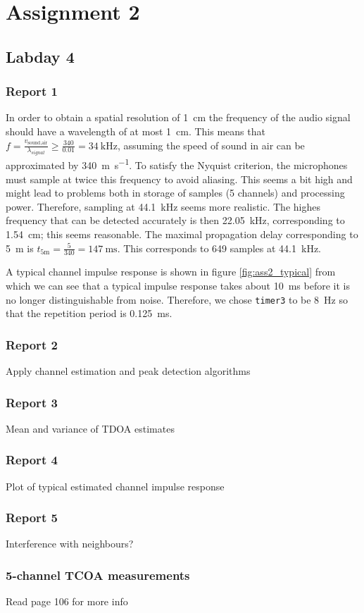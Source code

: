 \documentclass[11pt,titlepage]{report}
\begin{document}
\chapter{Assignment 2}
\section{Labday 4}

\subsection{Report 1}
In order to obtain a spatial resolution of \SI{1}{\centi\meter} the frequency of the audio signal should have a wavelength of at most \SI{1}{\centi\meter}. This means that $f=\frac{v_\text{sound,air}}{\lambda_{signal}}\geq\frac{340}{0.01}=\SI{34}{\kilo\hertz}$, assuming the speed of sound in air can be approximated by \SI{340}{\meter\per\second}. To satisfy the Nyquist criterion, the microphones must sample at twice this frequency to avoid aliasing. This seems a bit high and might lead to problems both in storage of samples (5 channels) and processing power. Therefore, sampling at \SI{44.1}{\kilo\hertz} seems more realistic. The highes frequency that can be detected accurately is then \SI{22.05}{\kilo\hertz}, corresponding to \SI{1.54}{\centi\meter}; this seems reasonable. The maximal propagation delay corresponding to \SI{5}{\meter} is $t_{\text{5m}}=\frac{5}{340}=\SI{147}{\milli\second}$. This corresponds to \num{649} samples at \SI{44.1}{\kilo\hertz}.


A typical channel impulse response is shown in figure \ref{fig:ass2_typical} from which we can see that a typical impulse response takes about \SI{10}{\milli\second} before it is no longer distinguishable from noise. Therefore, we chose \texttt{timer3} to be \SI{8}{\hertz} so that the repetition period is \SI{0.125}{\milli\second}.

\subsection{Report 2}
Apply channel estimation and peak detection algorithms

\subsection{Report 3}
Mean and variance of TDOA estimates

\subsection{Report 4}
Plot of typical estimated channel impulse response

\subsection{Report 5}
Interference with neighbours?

\subsection{5-channel TCOA measurements}
Read page 106 for more info
\end{document}
